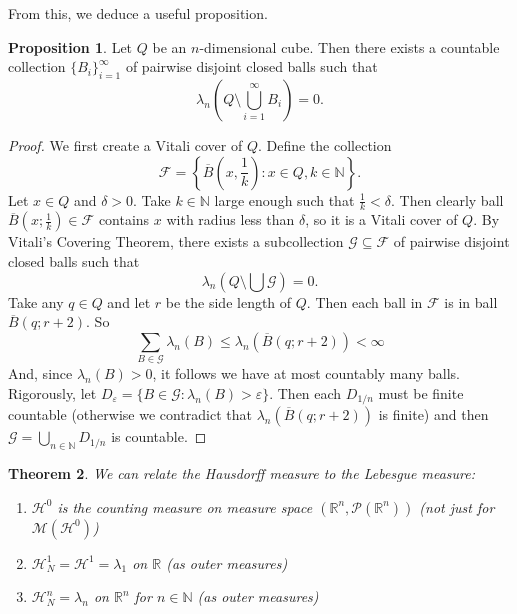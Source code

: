 \documentclass{article}
\theoremstyle{plain}
\newtheorem{thm}{Theorem}[section]
\theoremstyle{definition}
\newtheorem{prop}[thm]{Proposition}
\theoremstyle{remark}
\begin{document}
From this, we deduce a useful proposition.
\begin{prop} \label{prop:ball_cover}
    Let $Q$ be an $n$-dimensional cube. Then there exists a countable collection $\{B_i\}_{i =1}^\infty$ of pairwise disjoint closed balls such that
    \[
\lambda_n\left(Q \setminus \bigcup_{i=1}^{\infty} B_i\right) = 0.
\]
\end{prop}

\begin{proof}
    We first create a Vitali cover of $Q$. Define the collection
    \[
\mathcal{F} = \left\{\overline{B}\left(x, \frac{1}{k}\right) : x \in Q, k \in \mathbb{N}\right\}.
\]
Let $x \in Q$ and $\delta > 0$. Take $k \in \mathbb{N}$ large enough such that $\frac{1}{k} < \delta$. Then clearly ball $\overline{B}\left (x;\frac{1}{k} \right ) \in \mathcal{F}$ contains $x$ with radius less than $\delta$, so it is a Vitali cover of $Q$. By Vitali's Covering Theorem, there exists a subcollection $\mathcal{G} \subseteq \mathcal{F}$ of pairwise disjoint closed balls such that
\[
\lambda_n\left(Q \setminus \bigcup \mathcal{G}\right) = 0.
\]
Take any $q \in Q$ and let $r$ be the side length of $Q$. Then each ball in $\mathcal{F}$ is in ball $\overline{B}(q; r+2)$. So \[
\sum \limits _{B\in \mathcal{G}} \lambda _n(B) \le \lambda _n(\overline{B}(q;r+2)) < \infty
\]
And, since $\lambda _n(B) > 0$, it follows we have at most countably many balls. Rigorously, let $D_{\varepsilon} = \{B \in \mathcal{G}: \lambda_n(B) > \varepsilon\}$. Then each $D_{1/n}$ must be finite countable (otherwise we contradict that $\lambda _n(\overline{B}(q; r+2))$ is finite) and then $\mathcal{G} = \bigcup \limits _{n \in \mathbb{N}} D_{1/n}$ is countable.
\end{proof}






\begin{thm}
    We can relate the Hausdorff measure to the Lebesgue measure: 
    \begin{enumerate}
        \item $\mathcal{H}^0$ is the counting measure on measure space $(\mathbb{R}^n, \mathcal{P}(\mathbb{R}^n))$ (not just for $\mathcal{M}(\mathcal{H}^0)$)
        \item $\mathcal{H}^1_N=\mathcal{H}^1 = \lambda_1$ on $\mathbb{R}$ (as outer measures)
        \item $\mathcal{H}^n_N = \lambda_n$ on $\mathbb{R}^n$ for $n \in \mathbb{N}$ (as outer measures)
    \end{enumerate}
\end{thm}
\end{document}
